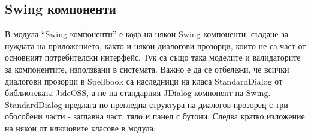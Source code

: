 \subsection{Swing компоненти}
В модула "`Swing компоненти"' е кода на някои Swing компоненти,
създане за нуждата на приложението, както и някои диалогови прозорци,
които не са част от основният потребителски интерфейс. Тук са също
така моделите и валидаторите за компонентите, използвани в
системата. Важно е да се отбележи, че всички диалогови прозорци в
Spellbook са наследници на класа StandardDialog от библиотеката
JideOSS, а не на стандарния JDialog компонент на Swing. StandardDialog
предлага по-прегледна структура на диалогов прозорец с три обособени
части - заглавна част, тяло и панел с бутони. Следва кратко изложение
на някои от ключовите класове в модула:


